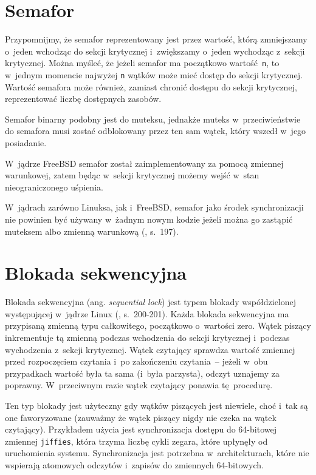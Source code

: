 \documentclass[shortabstract]{iithesis}
\theoremstyle{definition} \newtheorem*{definition}{Definicja}
\theoremstyle{definition} \newtheorem*{example}{Przykład}
\theoremstyle{definition} \newtheorem*{remark}{Uwaga}
\begin{document}
\section{Semafor}
Przypomnijmy, że semafor reprezentowany jest przez wartość, którą zmniejszamy o~jeden wchodząc do
sekcji krytycznej i~zwiększamy o~jeden wychodząc z~sekcji krytycznej.
Można myśleć, że jeżeli semafor ma początkowo wartość \texttt{n}, to w~jednym momencie najwyżej \texttt{n}
wątków może mieć dostęp do sekcji krytycznej. Wartość semafora może również, zamiast chronić dostępu
do sekcji krytycznej, reprezentować liczbę dostępnych zasobów.

Semafor binarny podobny jest do muteksu, jednakże muteks w~przeciwieństwie do semafora musi zostać odblokowany
przez ten sam wątek, który wszedł w~jego posiadanie.

W~jądrze FreeBSD semafor został zaimplementowany za pomocą zmiennej warunkowej, zatem
będąc w~sekcji krytycznej możemy wejść w~stan nieograniczonego uśpienia.

W~jądrach zarówno Linuksa, jak i~FreeBSD, semafor jako środek synchronizacji nie powinien być
używany w~żadnym nowym kodzie jeżeli można go zastąpić muteksem albo zmienną warunkową \cite{freebsd:sema}
(\cite{bib:lkd}, s.~197).

\section{Blokada sekwencyjna}

Blokada sekwencyjna (ang. \textit{sequential lock}) jest typem blokady współdzielonej występującej
w~jądrze Linux (\cite{bib:lkd}, s.~200-201). Każda blokada sekwencyjna ma przypisaną zmienną typu całkowitego,
początkowo o~wartości zero.
Wątek piszący inkrementuje tą zmienną podczas wchodzenia do sekcji krytycznej i~podczas wychodzenia z~sekcji
krytycznej. Wątek czytający sprawdza wartość zmiennej przed rozpoczęciem czytania i~po zakończeniu czytania~--
jeżeli w~obu przypadkach wartość była ta sama (i~była parzysta), odczyt uznajemy za poprawny.
W~przeciwnym razie wątek czytający ponawia tę procedurę.

Ten typ blokady jest użyteczny gdy wątków piszących jest niewiele, choć i~tak są one faworyzowane
(zauważmy że wątek piszący nigdy nie czeka na wątek czytający). Przykładem użycia jest synchronizacja
dostępu do 64-bitowej zmiennej \texttt{jiffies}, która trzyma liczbę cykli zegara, które upłynęły od
uruchomienia systemu. Synchronizacja jest potrzebna w~architekturach, które nie wspierają atomowych
odczytów i~zapisów do zmiennych 64-bitowych.
\end{document}
